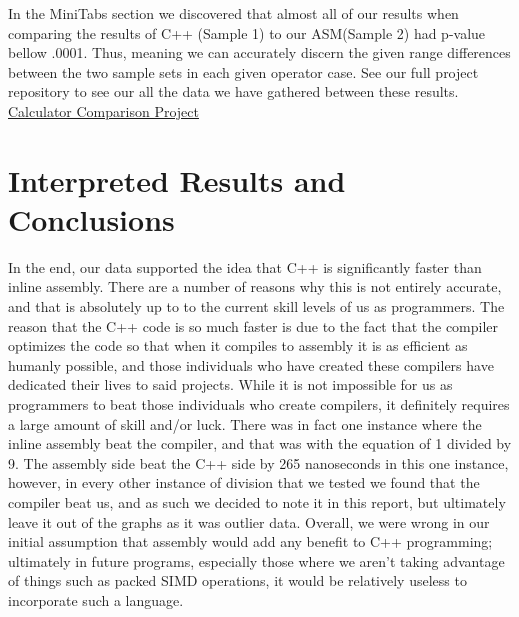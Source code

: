 \documentclass[a4paper,10pt]{article}
\begin{document}
In the MiniTabs section we discovered that almost all of our results when comparing the results of C++ (Sample 1) to our ASM(Sample 2) had p-value bellow .0001. Thus, meaning we can accurately discern the given range differences between the two sample sets in each given operator case. See our full project repository to see our all the data we have gathered between these results. 
\href{https://github.com/EricCacciavillani/Calculator_Comparison}{Calculator Comparison Project}



\section*{Interpreted Results and Conclusions}
\smallskip
In the end, our data supported the idea that C++ is significantly faster than inline assembly. There are a number of reasons why this is not entirely accurate, and that is absolutely up to to the current skill levels of us as programmers. The reason that the C++ code is so much faster is due to the fact that the compiler optimizes the code so that when it compiles to assembly it is as efficient as humanly possible, and those individuals who have created these compilers have dedicated their lives to said projects. While it is not impossible for us as programmers to beat those individuals who create compilers, it definitely requires a large amount of skill and/or luck. There was in fact one instance where the inline assembly beat the compiler, and that was with the equation of 1 divided by 9. The assembly side beat the C++ side by 265 nanoseconds in this one instance, however, in every other instance of division that we tested we found that the compiler beat us, and as such we decided to note it in this report, but ultimately leave it out of the graphs as it was outlier data. Overall, we were wrong in our initial assumption that assembly would add any benefit to C++ programming; ultimately in future programs, especially those where we aren't taking advantage of things such as packed SIMD operations, it would be relatively useless to incorporate such a language.
\end{document}
